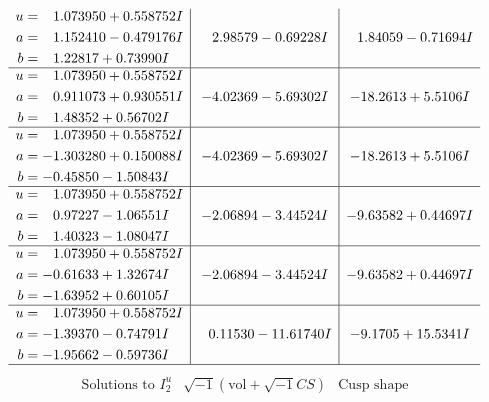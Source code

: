 \documentclass[1p]{elsarticle_modified}
\theoremstyle{definition}
\newcommand{\I}{\sqrt{-1}}
\begin{document}
$$\begin{array}{c|c|c}
\begin{aligned}
u &= \phantom{-}1.073950 + 0.558752 I \\
a &= \phantom{-}1.152410 - 0.479176 I \\
b &= \phantom{-}1.22817 + 0.73990 I\end{aligned}
 & \phantom{-}2.98579 - 0.69228 I & \phantom{-}1.84059 - 0.71694 I \\ \hline\begin{aligned}
u &= \phantom{-}1.073950 + 0.558752 I \\
a &= \phantom{-}0.911073 + 0.930551 I \\
b &= \phantom{-}1.48352 + 0.56702 I\end{aligned}
 & -4.02369 - 5.69302 I & -18.2613 + 5.5106 I \\ \hline\begin{aligned}
u &= \phantom{-}1.073950 + 0.558752 I \\
a &= -1.303280 + 0.150088 I \\
b &= -0.45850 - 1.50843 I\end{aligned}
 & -4.02369 - 5.69302 I & -18.2613 + 5.5106 I \\ \hline\begin{aligned}
u &= \phantom{-}1.073950 + 0.558752 I \\
a &= \phantom{-}0.97227 - 1.06551 I \\
b &= \phantom{-}1.40323 - 1.08047 I\end{aligned}
 & -2.06894 - 3.44524 I & -9.63582 + 0.44697 I \\ \hline\begin{aligned}
u &= \phantom{-}1.073950 + 0.558752 I \\
a &= -0.61633 + 1.32674 I \\
b &= -1.63952 + 0.60105 I\end{aligned}
 & -2.06894 - 3.44524 I & -9.63582 + 0.44697 I \\ \hline\begin{aligned}
u &= \phantom{-}1.073950 + 0.558752 I \\
a &= -1.39370 - 0.74791 I \\
b &= -1.95662 - 0.59736 I\end{aligned}
 & \phantom{-}0.11530 - 11.61740 I & -9.1705 + 15.5341 I\\
 \hline 
 \end{array}$$\newpage$$\begin{array}{c|c|c}  
\text{Solutions to }I^u_{2}& \I (\text{vol} + \sqrt{-1}CS) & \text{Cusp shape}\\
 \hline 
\begin{aligned}

\end{aligned}
\end{array}$$
\end{document}

